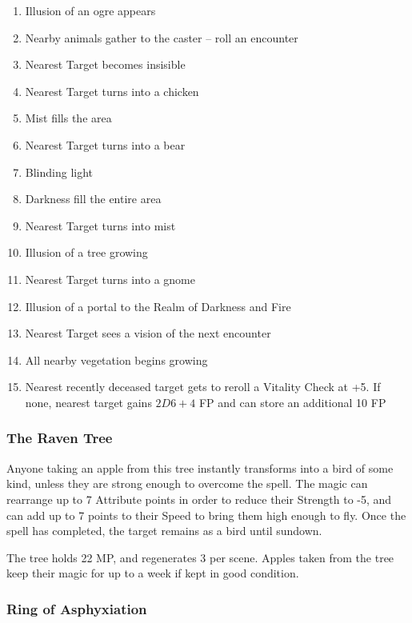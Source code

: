 \begin{multicols}{2}
\begin{tcolorbox}
	\begin{enumerate}
		\item{Illusion of an ogre appears}
		\item{Nearby animals gather to the caster -- roll an encounter}
		\item{Nearest Target becomes insisible}
		\item{Nearest Target turns into a chicken}
		\item{Mist fills the area}
		\item{Nearest Target turns into a bear}
		\item{Blinding light}
		\item{Darkness fill the entire area}
		\item{Nearest Target turns into mist}
		\item{Illusion of a tree growing}
		\item{Nearest Target turns into a gnome}
		\item{Illusion of a portal to the Realm of Darkness and Fire}
		\item{Nearest Target sees a vision of the next encounter}
		\item{All nearby vegetation begins growing}
		\item{Nearest recently deceased target gets to reroll a Vitality Check at +5.  If none, nearest target gains $2D6+4$ FP and can store an additional 10 FP}
	\end{enumerate}
\end{tcolorbox}

\subsubsection{The Raven Tree}
Anyone taking an apple from this tree instantly transforms into a bird of some kind, unless they are strong enough to overcome the spell.  The magic can rearrange up to 7 Attribute points in order to reduce their Strength to -5, and can add up to 7 points to their Speed to bring them high enough to fly.  Once the spell has completed, the target remains as a bird until sundown.

The tree holds 22 MP, and regenerates 3 per scene.  Apples taken from the tree keep their magic for up to a week if kept in good condition.

\subsubsection{Ring of Asphyxiation}


\end{multicols}
